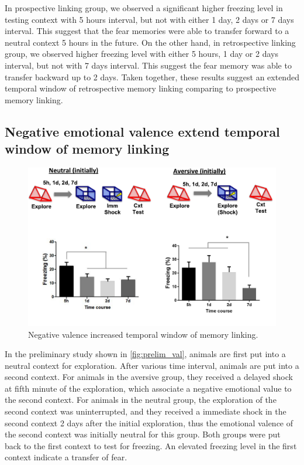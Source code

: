 \documentclass[master.tex]{subfiles}
\begin{document}
In prospective linking group, we observed a significant higher freezing level in
testing context with 5 hours interval, but not with either 1 day, 2 days or 7
days interval. This suggest that the fear memories were able to transfer forward
to a neutral context 5 hours in the future. On the other hand, in retrospective
linking group, we observed higher freezing level with either 5 hours, 1 day or 2
days interval, but not with 7 days interval. This suggest the fear memory was
able to transfer backward up to 2 days. Taken together, these results suggest an
extended temporal window of retrospective memory linking comparing to
prospective memory linking.

\subsection*{Negative emotional valence extend temporal window of memory
  linking}


\begin{figure}[h]
  \centering \includegraphics[scale = .4]{Figures/val_retro_prelim.pdf}
  \caption{\footnotesize Negative valence increased temporal window of memory
    linking.}
  \label{fig:prelim_val}
\end{figure}


In the preliminary study shown in \autoref{fig:prelim_val}, animals are first
put into a neutral context for exploration. After various time interval, animals
are put into a second context. For animals in the aversive group, they received
a delayed shock at fifth minute of the exploration, which associate a negative
emotional value to the second context. For animals in the neutral group, the
exploration of the second context was uninterrupted, and they received a
immediate shock in the second context 2 days after the initial exploration, thus
the emotional valence of the second context was initially neutral for this
group. Both groups were put back to the first context to test for freezing. An
elevated freezing level in the first context indicate a transfer of fear.
\end{document}
